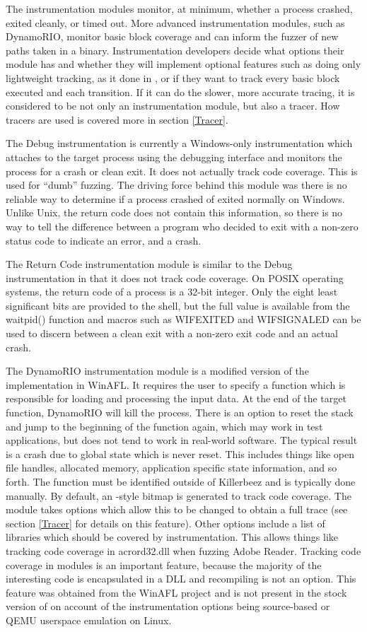 The instrumentation modules monitor, at minimum, whether a process crashed,
exited cleanly, or timed out. More advanced instrumentation modules, such as
DynamoRIO, monitor basic block coverage and can inform the fuzzer of new paths
taken in a binary.  Instrumentation developers decide what options their
module has and whether they will implement optional features such as doing
only lightweight tracking, as it done in \AFL{}, or if they want to track every
basic block executed and each transition.  If it can do the slower, more
accurate tracing, it is considered to be not only an instrumentation module,
but also a tracer.  How tracers are used is covered more in section
\ref{Tracer}.

The Debug instrumentation is currently a Windows-only instrumentation which
attaches to the target process using the debugging interface and monitors the
process for a crash or clean exit.  It does not actually track code coverage.
This is used for ``dumb'' fuzzing.  The driving force behind this module was
there is no reliable way to determine if a process crashed of exited normally
on Windows.  Unlike Unix, the return code does not contain this information,
so there is no way to tell the difference between a program who decided to
exit with a non-zero status code to indicate an error, and a crash.

The Return Code instrumentation module is similar to the Debug instrumentation
in that it does not track code coverage. On POSIX operating systems, the return
code of a process is a 32-bit integer.  Only the eight least significant bits
are provided to the shell, but the full value is available from the
waitpid() function and macros such as WIFEXITED and WIFSIGNALED can be used to
discern between a clean exit with a non-zero exit code and an actual crash.

The DynamoRIO instrumentation module is a modified version of the
implementation in WinAFL. It requires the user to specify a function which
is responsible for loading and processing the input data. At the end of the
target function, DynamoRIO will kill the process. There is an option to reset
the stack and jump to the beginning of the function again, which may work in
test applications, but does not tend to work in real-world software.  
The typical result is a crash due to global state which is never reset.
This includes things like open file handles, allocated memory, application specific state
information, and so forth. The function must be identified outside of
Killerbeez and is typically done manually. By default, an \AFL{}-style bitmap
is generated to track code coverage. The module takes options which allow this
to be changed to obtain a full trace (see section \ref{Tracer} for details on
this feature). Other options include a list of libraries which should be
covered by instrumentation. This allows things like tracking code coverage in acrord32.dll
when fuzzing Adobe Reader.  Tracking code coverage in modules is an important
feature, because the majority of the interesting code is encapsulated in a
DLL and recompiling is not an option. This feature was obtained from the
WinAFL\cite{winafl} project and is not present in the stock version of \AFL{}
on account of the instrumentation options being source-based or QEMU userspace
emulation on Linux.

